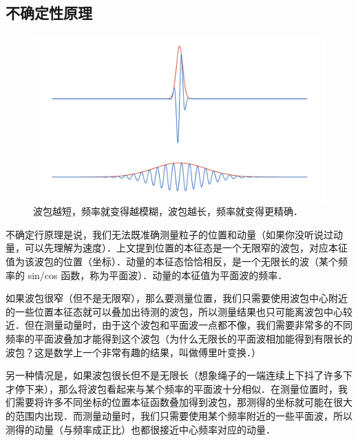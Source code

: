 \subsection{不确定性原理}

\begin{figure}[ht]
\centering
\includegraphics[width=14cm]{./figures/QM05.pdf}
\caption{波包越短，频率就变得越模糊，波包越长，频率就变得更精确．} \label{QM0_fig5}
\end{figure}

不确定行原理是说，我们无法既准确测量粒子的位置和动量（如果你没听说过动量，可以先理解为速度）．上文提到位置的本征态是一个无限窄的波包，对应本征值为该波包的位置（坐标）．动量的本征态恰恰相反，是一个无限长的波（某个频率的 sin/cos 函数，称为平面波）．动量的本征值为平面波的频率．

如果波包很窄（但不是无限窄），那么要测量位置，我们只需要使用波包中心附近的一些位置本征态就可以叠加出待测的波包，所以测量结果也只可能离波包中心较近．但在测量动量时，由于这个波包和平面波一点都不像，我们需要非常多的不同频率的平面波叠加才能得到这个波包（为什么无限长的平面波相加能得到有限长的波包？这是数学上一个非常有趣的结果，叫做傅里叶变换．）

另一种情况是，如果波包很长但不是无限长（想象绳子的一端连续上下抖了许多下才停下来），那么将波包看起来与某个频率的平面波十分相似．在测量位置时，我们需要将许多不同坐标的位置本征函数叠加得到波包，那测得的坐标就可能在很大的范围内出现．而测量动量时，我们只需要使用某个频率附近的一些平面波，所以测得的动量（与频率成正比）也都很接近中心频率对应的动量．

